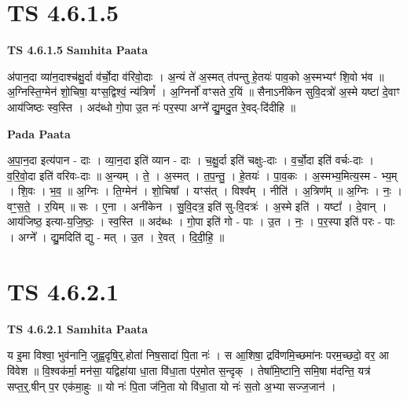 \documentclass[17pt]{extarticle}
\begin{document}
\section{ TS 4.6.1.5 }

\textbf{TS 4.6.1.5 } \newline
\textbf{Samhita Paata} \newline

अ॑पान॒दा व्या॑न॒दाश्च॑क्षु॒र्दा व॑र्चो॒दा व॑रिवो॒दाः । अ॒न्यं ते॑ अ॒स्मत् त॑पन्तु हे॒तयः॑ पाव॒को अ॒स्मभ्यꣳ॑ शि॒वो भ॑व ॥ अ॒ग्निस्ति॒ग्मेन॑ शो॒चिषा॒ यꣳस॒द्विश्वं॒ न्य॑त्रिणं᳚ । अ॒ग्निर्नो॑ वꣳसते र॒यिं ॥ सैनाऽनी॑केन सुवि॒दत्रो॑ अ॒स्मे यष्टा॑ दे॒वाꣳ आय॑जिष्ठः स्व॒स्ति । अद॑ब्धो गो॒पा उ॒त नः॑ पर॒स्पा अग्ने᳚ द्यु॒मदु॒त रे॒वद्-दि॑दीहि ॥ \newline

\textbf{Pada Paata} \newline

अ॒पा॒न॒दा इत्य॑पान - दाः । व्या॒न॒दा इति॑ व्यान - दाः । च॒क्षु॒र्दा इति॑ चक्षुः-दाः । व॒र्चो॒दा इति॑ वर्चः-दाः । व॒रि॒वो॒दा इति॑ वरिवः-दाः ॥ अ॒न्यम् । ते॒ । अ॒स्मत् । त॒प॒न्तु॒ । हे॒तयः॑ । पा॒व॒कः । अ॒स्मभ्य॒मित्य॒स्म - भ्य॒म् । शि॒वः । भ॒व॒ ॥ अ॒ग्निः । ति॒ग्मेन॑ । शो॒चिषा᳚ । यꣳस॑त् । विश्व᳚म् । नीति॑ । अ॒त्रिण᳚म् ॥ अ॒ग्निः । नः॒ । वꣳ॒॒स॒ते॒ । र॒यिम् ॥ सः । ए॒ना । अनी॑केन । सु॒वि॒दत्र॒ इति॑ सु-वि॒दत्रः॑ । अ॒स्मे इति॑ । यष्टा᳚ । दे॒वान् । आय॑जिष्ठ॒ इत्या-य॒जि॒ष्ठः॒ । स्व॒स्ति ॥ अद॑ब्धः । गो॒पा इति॑ गो - पाः । उ॒त । नः॒ । प॒र॒स्पा इति॑ परः - पाः । अग्ने᳚ । द्यु॒मदिति॑ द्यु - मत् । उ॒त । रे॒वत् । दि॒दी॒हि॒ ॥  \newline





\section{ TS 4.6.2.1 }

\textbf{TS 4.6.2.1 } \newline
\textbf{Samhita Paata} \newline

य इ॒मा विश्वा॒ भुव॑नानि॒ जुह्व॒दृषि॒र्॒.होता॑ निष॒सादा॑ पि॒ता नः॑ । स आ॒शिषा॒ द्रवि॑णमि॒च्छमा॑नः परम॒च्छदो॒ वर॒ आ वि॑वेश ॥ वि॒श्वक॑र्मा॒ मन॑सा॒ यद्विहा॑या धा॒ता वि॑धा॒ता प॑र॒मोत स॒न्दृक् । तेषा॑मि॒ष्टानि॒ समि॒षा म॑दन्ति॒ यत्र॑ सप्त॒र्॒.षीन् प॒र एक॑मा॒हुः ॥ यो नः॑ पि॒ता ज॑नि॒ता यो वि॑धा॒ता यो नः॑ स॒तो अ॒भ्या सज्ज॒जान॑ । \newline
\end{document}
